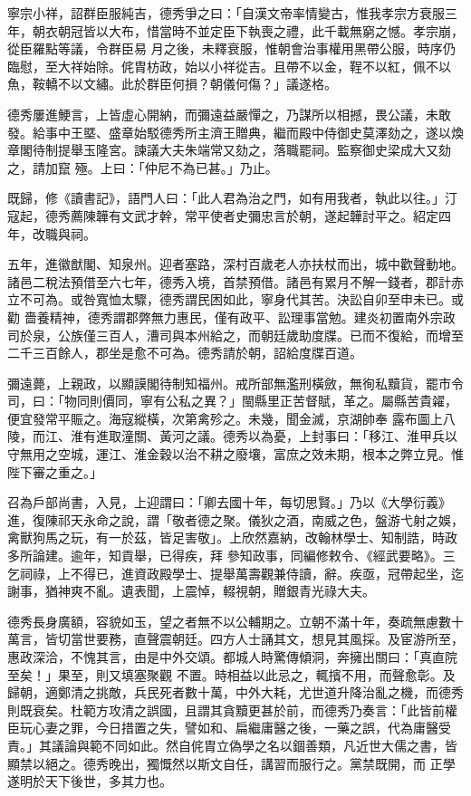\begin{pinyinscope}
 寧宗小祥，詔群臣服純吉，德秀爭之曰：「自漢文帝率情變古，惟我孝宗方衰服三年，朝衣朝冠皆以大布，惜當時不並定臣下執喪之禮，此千載無窮之憾。孝宗崩，從臣羅點等議，令群臣易
 月之後，未釋衰服，惟朝會治事權用黑帶公服，時序仍臨慰，至大祥始除。侂胄枋政，始以小祥從吉。且帶不以金，鞓不以紅，佩不以魚，鞍轎不以文繡。此於群臣何損？朝儀何傷？」議遂格。



 德秀屢進鯁言，上皆虛心開納，而彌遠益嚴憚之，乃謀所以相撼，畏公議，未敢發。給事中王塈、盛章始駁德秀所主濟王贈典，繼而殿中侍御史莫澤劾之，遂以煥章閣待制提舉玉隆宮。諫議大夫朱端常又劾之，落職罷祠。監察御史梁成大又劾之，請加竄
 殛。上曰：「仲尼不為已甚。」乃止。



 既歸，修《讀書記》，語門人曰：「此人君為治之門，如有用我者，執此以往。」汀寇起，德秀薦陳韡有文武才幹，常平使者史彌忠言於朝，遂起韡討平之。紹定四年，改職與祠。



 五年，進徽猷閣、知泉州。迎者塞路，深村百歲老人亦扶杖而出，城中歡聲動地。諸邑二稅法預借至六七年，德秀入境，首禁預借。諸邑有累月不解一錢者，郡計赤立不可為。或咎寬恤太驟，德秀謂民困如此，寧身代其苦。決訟自卯至申未已。或勸
 嗇養精神，德秀謂郡弊無力惠民，僅有政平、訟理事當勉。建炎初置南外宗政司於泉，公族僅三百人，漕司與本州給之，而朝廷歲助度牒。已而不復給，而增至二千三百餘人，郡坐是愈不可為。德秀請於朝，詔給度牒百道。



 彌遠薨，上親政，以顯謨閣待制知福州。戒所部無濫刑橫斂，無徇私黷貨，罷市令司，曰：「物同則價同，寧有公私之異？」閩縣里正苦督賦，革之。屬縣苦貴糴，便宜發常平賑之。海寇縱橫，次第禽殄之。未幾，聞金滅，京湖帥奉
 露布圖上八陵，而江、淮有進取潼關、黃河之議。德秀以為憂，上封事曰：「移江、淮甲兵以守無用之空城，運江、淮金穀以治不耕之廢壤，富庶之效未期，根本之弊立見。惟陛下審之重之。」



 召為戶部尚書，入見，上迎謂曰：「卿去國十年，每切思賢。」乃以《大學衍義》進，復陳祁天永命之說，謂「敬者德之聚。儀狄之酒，南威之色，盤游弋射之娛，禽獸狗馬之玩，有一於茲，皆足害敬」。上欣然嘉納，改翰林學士、知制誥，時政多所論建。逾年，知貢舉，已得疾，拜
 參知政事，同編修敕令、《經武要略》。三乞祠祿，上不得已，進資政殿學士、提舉萬壽觀兼侍讀，辭。疾亟，冠帶起坐，迄謝事，猶神爽不亂。遺表聞，上震悼，輟視朝，贈銀青光祿大夫。



 德秀長身廣額，容貌如玉，望之者無不以公輔期之。立朝不滿十年，奏疏無慮數十萬言，皆切當世要務，直聲震朝廷。四方人士誦其文，想見其風採。及宦游所至，惠政深洽，不愧其言，由是中外交頌。都城人時驚傳傾洞，奔擁出關曰：「真直院至矣！」果至，則又填塞聚觀
 不置。時相益以此忌之，輒擯不用，而聲愈彰。及歸朝，適鄭清之挑敵，兵民死者數十萬，中外大耗，尤世道升降治亂之機，而德秀則既衰矣。杜範方攻清之誤國，且謂其貪黷更甚於前，而德秀乃奏言：「此皆前權臣玩心妻之罪，今日措置之失，譬如和、扁繼庸醫之後，一藥之誤，代為庸醫受責。」其議論與範不同如此。然自侂胄立偽學之名以錮善類，凡近世大儒之書，皆顯禁以絕之。德秀晚出，獨慨然以斯文自任，講習而服行之。黨禁既開，而
 正學遂明於天下後世，多其力也。




\end{pinyinscope}
